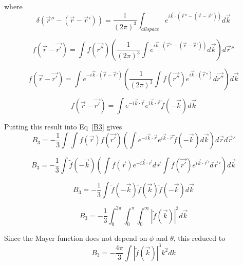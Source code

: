 \documentclass[double,12pt]{beavtex}
\begin{document}
where
\begin{equation}{\delta}(\vec{r}''-(\vec{r}-\vec{r}'))={ \frac{1}{\left(2\pi\right)^3}\int_{allspace} e^{i\vec k\cdot (\vec{r}''-(\vec r-\vec r'))}d\vec{k}}\end{equation} 

\begin{equation}f(\vec{r}-\vec{r'})=\int{f(\vec{r''})\left( \frac{1}{\left(2\pi\right)^3}\int e^{i\vec k\cdot (\vec{r}''-(\vec r-\vec r'))}d\vec{k} \right) d\vec r''} \end{equation}

\begin{equation}f(\vec{r}-\vec{r'})=\int{ e^{-i\vec k\cdot (\vec r-\vec r')}\left(\frac{1}{\left(2\pi\right)^3}\int{f(\vec{r''}) e^{i\vec k\cdot (\vec{r}'')}d\vec{r''}} \right) d\vec k} \end{equation}

\begin{equation}f(\vec{r}-\vec{r'})=\int{ e^{-i\vec k\cdot \vec r}e^{i\vec k\cdot \vec r}\widetilde{f}(-\vec k) d\vec k} \end{equation}

Putting this result into Eq~\ref{B3} gives
\begin{equation}B_3=-\frac{1}{3}\int{\int{f(\vec{r})f(\vec{r'})\left(\int{ e^{-i\vec k\cdot \vec r}e^{i\vec k\cdot \vec r}\widetilde{f}(-\vec k) d\vec k}\right)d\vec rd\vec r'}}\end{equation}

\begin{equation}B_3=-\frac{1}{3}\int{\widetilde{f}(-\vec k)\left(\int{f(\vec{r})e^{-i\vec k\cdot \vec r}}d\vec r\int{f(\vec{r'})e^{i\vec k\cdot \vec r'} d\vec r'}\right)d\vec k}\end{equation}

\begin{equation}B_3=-\frac{1}{3}\int{\widetilde{f}(-\vec k)\widetilde{f}(\vec k)\widetilde{f}(-\vec k)d\vec k}\end{equation}

\begin{equation}B_3=-\frac{1}{3}\int_0^{2\pi}\int_0^{\pi}\int_0^{\infty}{|\widetilde{f}(\vec k)|^3d\vec k}\end{equation}

Since the Mayer function does not depend on $\phi$ and $\theta$, this reduced to
\begin{equation}B_3=-\frac{4\pi}{3}\int{|\widetilde{f}(\vec k)|^3k^2dk}\end{equation}
\end{document}
